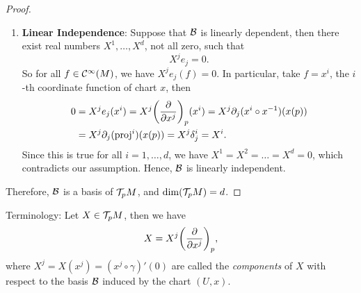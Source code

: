\begin{proof}
\begin{enumerate}
        \item \textbf{Linear Independence}: Suppose that \(\mathcal B\) is linearly dependent, then there exist real numbers \(X^1, \ldots, X^d\), not all zero, such that
              \begin{equation}
                  X^j e_j = 0.
              \end{equation}
              So for all \(f \in \mathcal C^\infty(M)\), we have \(X^j e_j(f) = 0\). In particular, take \(f = x^i\), the \(i\)-th coordinate function of chart \(x\), then
              \begin{align*}
                  0 & = X^j e_j(x^i) = X^j \qty(\pdv{x^j})_p (x^i) = X^j \partial_j (x^i \circ x^{-1})(x(p)) \\
                    & = X^j \partial_j (\operatorname{proj}^i) (x(p)) = X^j \delta_j^i = X^i.
              \end{align*}
              Since this is true for all \(i = 1, \ldots, d\), we have \(X^1 = X^2 = \ldots = X^d = 0\), which contradicts our assumption. Hence, \(\mathcal B\) is linearly independent.
    \end{enumerate}
    Therefore, \(\mathcal B\) is a basis of \(\mathcal T_p M\), and \(\dim(\mathcal T_p M) = d\).
\end{proof}
Terminology: Let \(X \in \mathcal T_p M\), then we have
\begin{equation}
    X = X^j \qty(\pdv{x^j})_p,
\end{equation}
where \(X^j = X(x^j) = (x^j \circ \gamma)'(0)\) are called the \emph{components} of \(X\) with respect to the basis \(\mathcal B\) induced by the chart \((U, x)\).

